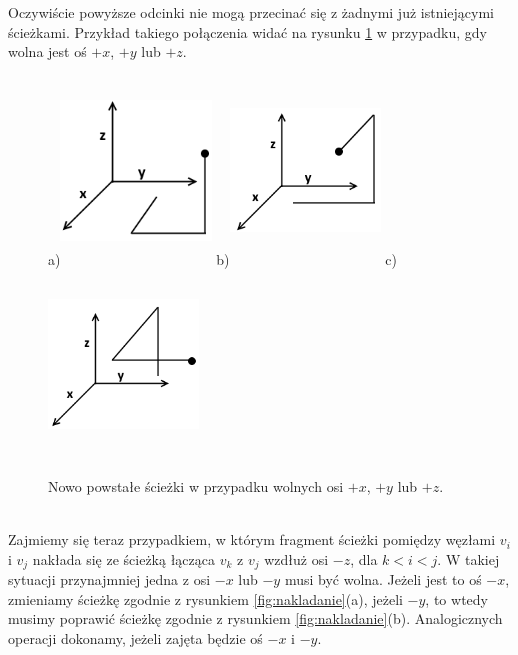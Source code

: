\documentclass{xmgr}
\theoremstyle{definition}
\begin{document}
Oczywiście powyższe odcinki nie mogą przecinać się z żadnymi już istniejącymi ścieżkami. Przykład takiego połączenia widać na rysunku \ref{fig:nowe sciezki} w przypadku, gdy wolna jest oś $+x$, $+y$ lub $+z$.
\begin{figure}[ht!]
  \centering
  a)\includegraphics[width=4cm,height=5cm]{rysunki/wolne_x.png}
  b)\includegraphics[width=4cm,height=5cm]{rysunki/wolne_y.png}
  c)\includegraphics[width=4cm,height=5cm]{rysunki/wolne_z.png}
  \caption{Nowo powstałe ścieżki w przypadku wolnych osi $+x$, $+y$ lub $+z$.}
  \label{fig:nowe sciezki}
\end{figure} 
\\\indent Zajmiemy się teraz przypadkiem, w którym fragment ścieżki pomiędzy węzłami $v_i$ i $v_j$ nakłada się ze ścieżką łącząca $v_k$ z $v_j$ wzdłuż osi $-z$, dla $k < i < j$. W takiej sytuacji przynajmniej jedna z osi $-x$ lub $-y$ musi być wolna. Jeżeli jest to oś $-x$, zmieniamy ścieżkę zgodnie z rysunkiem \ref{fig:nakladanie}(a), jeżeli $-y$, to wtedy musimy poprawić ścieżkę zgodnie z rysunkiem \ref{fig:nakladanie}(b). Analogicznych operacji dokonamy, jeżeli zajęta będzie oś $-x$ i $-y$.
\end{document}
